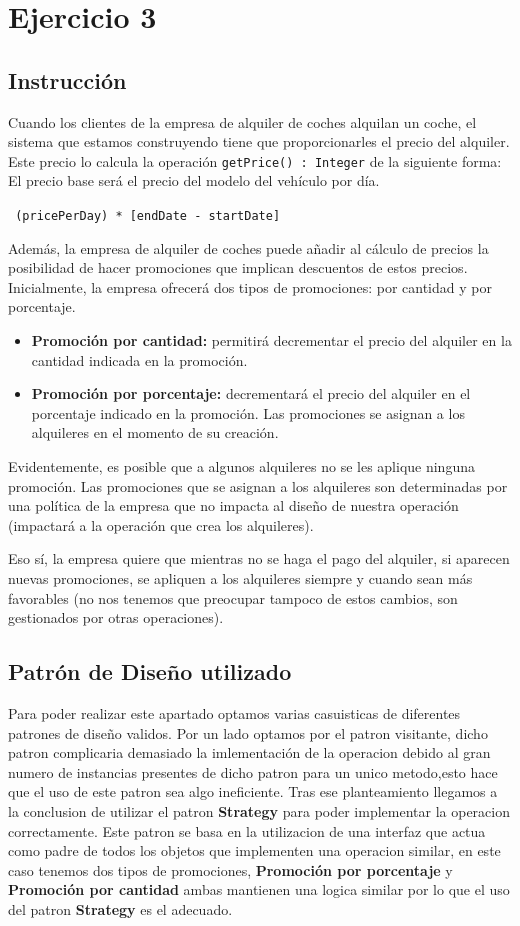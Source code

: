 \section{Ejercicio 3}
\subsection*{Instrucción}
Cuando los clientes de la empresa de alquiler de coches alquilan un coche, el sistema que estamos construyendo
tiene que proporcionarles el precio del alquiler. Este precio lo calcula la operación \texttt{getPrice() : Integer} de la siguiente
forma: El precio base será el precio del modelo del vehículo por día.
\begin{center}
    \texttt{ (pricePerDay) * [endDate - startDate]}
\end{center}
Además, la empresa de alquiler de coches puede añadir al cálculo de precios la posibilidad de hacer promociones
que implican descuentos de estos precios. Inicialmente, la empresa ofrecerá dos tipos de promociones: por cantidad
y por porcentaje.
\begin{itemize}
    \item \textbf{Promoción por cantidad:} permitirá decrementar el precio del alquiler en la cantidad indicada en
    la promoción.
    \item \textbf{Promoción por porcentaje:} decrementará el precio del alquiler en el porcentaje indicado en la
    promoción. Las promociones se asignan a los alquileres en el momento de su creación.
\end{itemize}
Evidentemente, es posible
que a algunos alquileres no se les aplique ninguna promoción. Las promociones que se asignan a los alquileres son
determinadas por una política de la empresa que no impacta al diseño de nuestra operación (impactará a la
operación que crea los alquileres).\par
\vspace{0.15cm}
Eso sí, la empresa quiere que mientras no se haga el pago del alquiler, si aparecen
nuevas promociones, se apliquen a los alquileres siempre y cuando sean más favorables (no nos tenemos que
preocupar tampoco de estos cambios, son gestionados por otras operaciones).


\subsection{Patrón de Diseño utilizado}
Para poder realizar este apartado optamos varias casuisticas de diferentes patrones de diseño validos. Por un lado optamos por el patron visitante,
dicho patron complicaria demasiado la imlementación de la operacion debido al gran numero de instancias presentes de dicho patron para un unico metodo,esto hace que 
el uso de este patron sea algo ineficiente. Tras ese planteamiento llegamos a la conclusion de utilizar el patron \textbf{Strategy} para poder implementar la operacion correctamente.
Este patron se basa en la utilizacion de una interfaz que actua como padre de todos los objetos que implementen una operacion similar, en este caso tenemos dos tipos de promociones,
\textbf{Promoción por porcentaje} y \textbf{Promoción por cantidad} ambas mantienen una logica similar por lo que el uso del patron \textbf{Strategy} es el adecuado.

